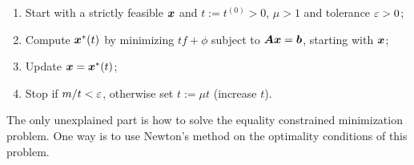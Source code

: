 \begin{enumerate}
 \item Start with a strictly feasible $\bm{x}$ and $t:=t^{(0)}>0$, $\mu>1$ and tolerance $\varepsilon>0$;
 \item Compute $\bm{x}^*(t)$ by minimizing $tf+\phi$ subject to $\bm{A}\bm{x}=\bm{b}$, starting with $\bm{x}$;
 \item Update $\bm{x} = \bm{x}^*(t)$;
 \item Stop if $m/t<\varepsilon$, otherwise set $t:=\mu t$ (increase $t$).
\end{enumerate}

The only unexplained part is how to solve the equality constrained minimization problem. One way is to use Newton's method on the optimality conditions of this problem.

